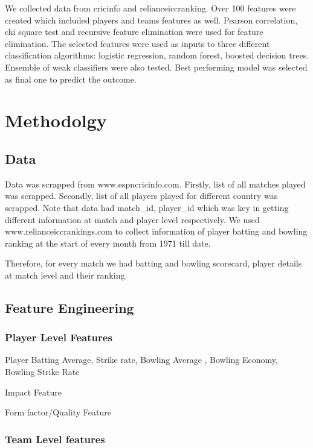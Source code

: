 \documentclass[a4paper]{article}
\begin{document}
We collected data from cricinfo and relianceiccranking. Over 100 features were created which included players and teams features as well.  Pearson correlation, chi square test and recursive feature elimination were used for feature elimination. The selected features were used as inputs to three different classification algorithms: logistic regression,
random forest, boosted decision trees. Ensemble of weak classifiers were also tested. Best performing model was selected as final one to predict the outcome.


\section{Methodolgy}

\subsection{Data}

Data was scrapped from www.espncricinfo.com. Firstly, list of all matches played was scrapped. Secondly, list of all players played for different country was scrapped. Note that data had match\_id, player\_id which was key in getting different information
at match and player level respectively. We used www.relianceiccrankings.com to collect information of player batting and bowling ranking at the start of every month from 1971 till date. 

Therefore, for every match we had batting and bowling scorecard, player details at match level and their ranking. 



\subsection{Feature Engineering}
\subsubsection{
Player Level Features
}

Player Batting Average, Strike rate, Bowling Average , Bowling Economy, Bowling Strike Rate 

Impact Feature

Form factor/Quality Feature

\subsubsection{Team Level features
}
\end{document}
